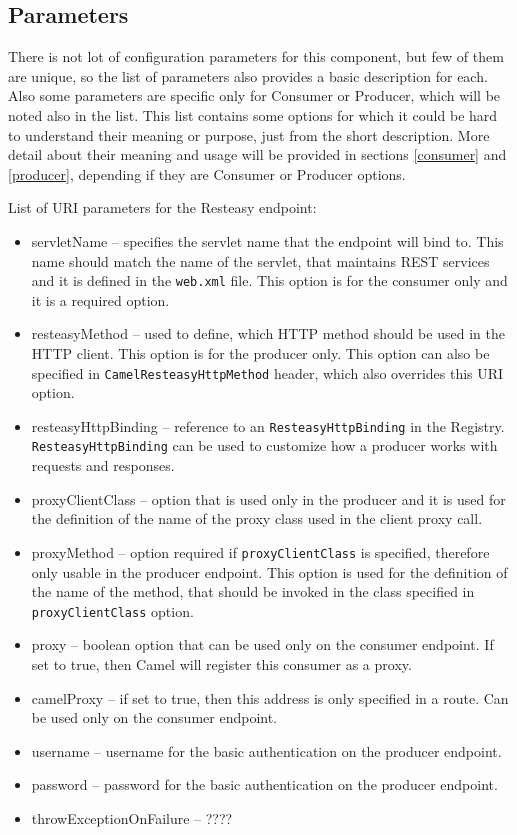 \documentclass[12pt,final,oneside]{fithesis2}
\begin{document}
\subsection{Parameters}
There is not lot of configuration parameters for this component, but few of them are unique, so the list of parameters also provides a basic description for each. Also some parameters are specific only for Consumer or Producer, which will be noted also in the list. This list contains some options for which it could be hard to understand their meaning or purpose, just from the short description. More detail about their meaning and usage will be provided in sections \ref{consumer} and \ref{producer}, depending if they are Consumer or Producer options.  

List of URI parameters for the Resteasy endpoint:
\begin{itemize}
\item
servletName -- specifies the servlet name that the endpoint will bind to. This name should match the name of the servlet, that maintains REST services and it is defined in the \texttt{web.xml} file. This option is for the consumer only and it is a required option. 

\item
resteasyMethod -- used to define, which HTTP method should be used in the HTTP client. This option is for the producer only. This option can also be specified in \texttt{CamelResteasyHttpMethod} header, which also overrides  this URI option.

\item
resteasyHttpBinding --  reference to an \texttt{ResteasyHttpBinding} in the Registry. \texttt{ResteasyHttpBinding} can be used to customize how a producer works with requests and responses.

\item
proxyClientClass -- option that is used only in the producer and it is used for the definition of the name of the proxy class used in the client proxy call.

\item    
proxyMethod -- option required if \texttt{proxyClientClass} is specified, therefore only usable in the producer endpoint. This option is used for the definition of the name of the method, that should be invoked in the class specified in \texttt{proxyClientClass} option.

\item
proxy -- boolean option that can be used only on the consumer endpoint. If set to true, then Camel will register this consumer as a proxy. 

\item 
camelProxy -- if set to true, then this address is only specified in a route. Can be used only on the consumer endpoint.

\item
username -- username for the basic authentication on the producer endpoint.

\item
password -- password for the basic authentication on the producer endpoint.

\item
throwExceptionOnFailure -- ????
\end{itemize}
\end{document}
